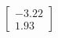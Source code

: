 \documentclass[preview]{standalone}
\begin{document}
\begin{align*}
\begin{bmatrix} -3.22 \\ 1.93 \end{bmatrix}
\end{align*}
\end{document}
